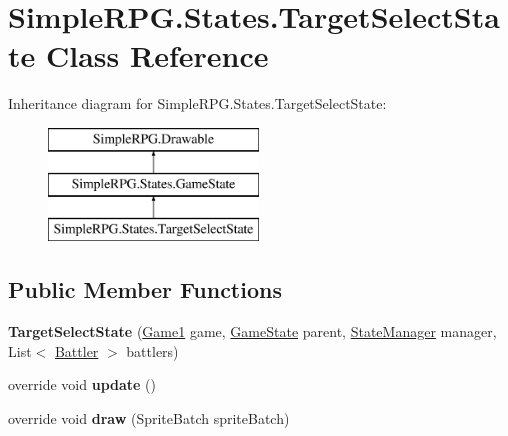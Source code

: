 \hypertarget{class_simple_r_p_g_1_1_states_1_1_target_select_state}{\section{Simple\-R\-P\-G.\-States.\-Target\-Select\-State Class Reference}
\label{class_simple_r_p_g_1_1_states_1_1_target_select_state}
}
Inheritance diagram for Simple\-R\-P\-G.\-States.\-Target\-Select\-State\-:\begin{figure}[H]
\begin{center}
\leavevmode
\includegraphics[height=3.000000cm]{class_simple_r_p_g_1_1_states_1_1_target_select_state}
\end{center}
\end{figure}
\subsection*{Public Member Functions}
\begin{DoxyCompactItemize}
\item 
\hypertarget{class_simple_r_p_g_1_1_states_1_1_target_select_state_abc7562e63e14f09da3ca852ff0b90435}{{\bfseries Target\-Select\-State} (\hyperlink{class_simple_r_p_g_1_1_game1}{Game1} game, \hyperlink{class_simple_r_p_g_1_1_states_1_1_game_state}{Game\-State} parent, \hyperlink{class_simple_r_p_g_1_1_states_1_1_state_manager}{State\-Manager} manager, List$<$ \hyperlink{class_simple_r_p_g_1_1_battler}{Battler} $>$ battlers)}\label{class_simple_r_p_g_1_1_states_1_1_target_select_state_abc7562e63e14f09da3ca852ff0b90435}

\item 
\hypertarget{class_simple_r_p_g_1_1_states_1_1_target_select_state_a4b729abe4fd79d8e152a2eb8af5042ea}{override void {\bfseries update} ()}\label{class_simple_r_p_g_1_1_states_1_1_target_select_state_a4b729abe4fd79d8e152a2eb8af5042ea}

\item 
\hypertarget{class_simple_r_p_g_1_1_states_1_1_target_select_state_a614028f6f0d57d1f7c7e4e0cf9e879e3}{override void {\bfseries draw} (Sprite\-Batch sprite\-Batch)}\label{class_simple_r_p_g_1_1_states_1_1_target_select_state_a614028f6f0d57d1f7c7e4e0cf9e879e3}

\end{DoxyCompactItemize}
